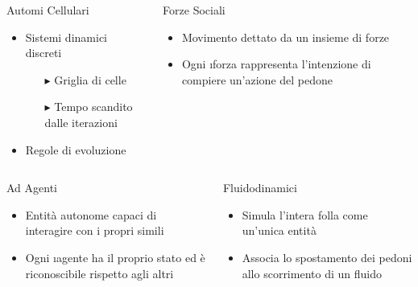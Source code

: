 \begin{columns}
    \begin{column}{0.45\linewidth}
        \begin{block}{Automi Cellulari}
            \begin{itemize}
                \item Sistemi dinamici discreti
                \begin{itemize}
                    \item[$\blacktriangleright$] Griglia di celle
                    \item[$\blacktriangleright$] Tempo scandito dalle iterazioni
                \end{itemize}
                \item Regole di evoluzione
            \end{itemize}
        \end{block}
    \end{column}
    
    \begin{column}{0.45\linewidth}
        \begin{block}{Forze Sociali}
            \begin{itemize}
                \item Movimento dettato da un insieme di forze
                \item Ogni \i{forza} rappresenta l'intenzione di compiere un'azione del pedone
            \end{itemize}
        \end{block}
    \end{column}
\end{columns}

\begin{columns}
    \begin{column}{0.45\linewidth}
        \begin{block}{Ad Agenti}
            \begin{itemize}
                \item Entità autonome capaci di interagire con i propri simili
                \item Ogni \i{agente} ha il proprio stato ed è riconoscibile rispetto agli altri
            \end{itemize}
        \end{block}
    \end{column}
    
    \begin{column}{0.45\linewidth}
        \begin{block}{Fluidodinamici}
            \begin{itemize}
                \item Simula l'intera folla come un'unica entità
                \item Associa lo spostamento dei pedoni allo scorrimento di un fluido
            \end{itemize}
        \end{block}
    \end{column}
\end{columns}